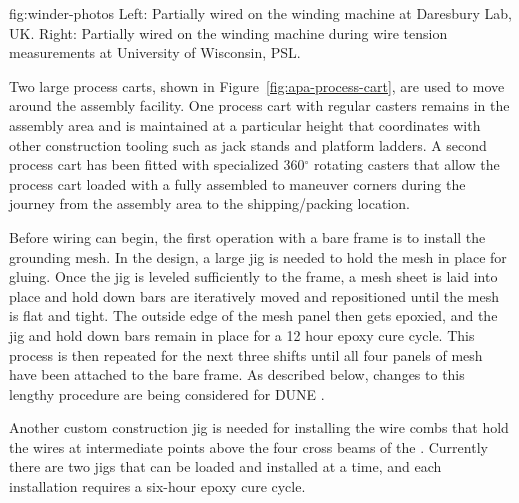 \begin{dunefigure}{fig:winder-photos}
{Left: Partially wired   on the winding machine at Daresbury Lab, UK. Right: Partially wired   on the winding machine during wire tension measurements at University of Wisconsin, PSL.}
\setlength{\fboxsep}{0pt}
\setlength{\fboxrule}{0.5pt}
\end{dunefigure}

Two large process carts, shown in Figure~\ref{fig:apa-process-cart}, are used to move  around the assembly facility. 
One process cart with regular casters remains in the assembly area and is maintained at a particular height that coordinates with other construction tooling such as jack stands and platform ladders. A second process cart has been fitted with specialized 360$^\circ$ rotating casters that allow the process cart loaded with a fully assembled  to maneuver corners during the journey from the assembly area to the shipping/packing location.

Before wiring can begin, the first operation with a bare frame is to install the grounding mesh. In the  design, a large jig is needed to hold the mesh in place for gluing. Once the jig is leveled sufficiently to the frame, a mesh sheet is laid into place and hold down bars are iteratively moved and repositioned until the mesh is flat and tight.  The outside edge of the mesh panel then gets epoxied, and the jig and hold down bars remain in place for a 12 hour epoxy cure cycle.  This process is then repeated for the next three shifts until all four panels of mesh have been attached to the bare  frame.  As described below, changes to this lengthy procedure are being considered for DUNE .  

Another custom construction jig is needed for installing the wire combs that hold the wires at intermediate points above the four cross beams of the .  Currently there are two jigs that can be loaded and installed at a time, and each installation requires a six-hour epoxy cure cycle. %


